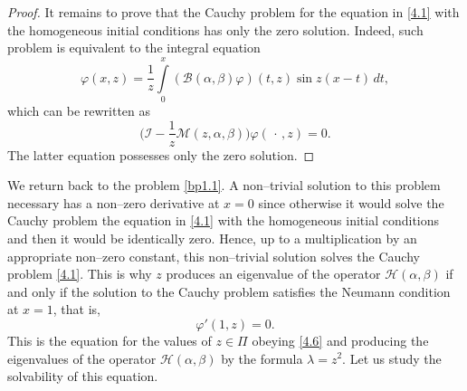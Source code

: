\documentclass[10pt, a4paper]{article}
\theoremstyle{plain}
\theoremstyle{definition}
\numberwithin{equation}{section}
\def\cI{\mathcal{I}}
\begin{document}
\begin{proof}
It remains to prove that the Cauchy problem for the equation in \eqref{4.1} with the homogeneous initial conditions has only
the zero solution. Indeed, such problem is equivalent to the integral equation
\begin{equation*}
\varphi(x,z) = \frac{1}{z}\int\limits_0^{x}(\mathcal{B}(\alpha, \beta)\varphi)(t, z)\sin z(x-t)\,dt,
\end{equation*}
which can be rewritten as
\begin{equation*}
\Big(\cI-\frac{1}{z}\mathcal{M}(z,\alpha, \beta)\Big)\varphi(\,\cdot\,, z)=0.
\end{equation*}
The latter equation possesses only the zero solution.
\end{proof}

We return back to the problem \eqref{bp1.1}. A non--trivial solution to this problem necessary has a non--zero
derivative at $x=0$ since otherwise it would solve the Cauchy problem the equation in \eqref{4.1} with the homogeneous
initial conditions and then it would be identically zero. Hence, up to a multiplication by an appropriate non--zero
constant, this non--trivial solution solves the Cauchy problem \eqref{4.1}. This is why $z$ produces an eigenvalue of
the operator $\mathcal{H}(\alpha, \beta)$ if and only if the solution to the Cauchy problem satisfies the Neumann condition
at $x=1$, that is,
\begin{equation}\label{4.12}
\varphi'(1, z)=0.
\end{equation}
This is the equation for the values of $z\in\Pi$ obeying \eqref{4.6} and producing the eigenvalues of the
operator $\mathcal{H}(\alpha, \beta)$ by the formula $\lambda=z^2$. Let us study the solvability of this equation.
\end{document}
